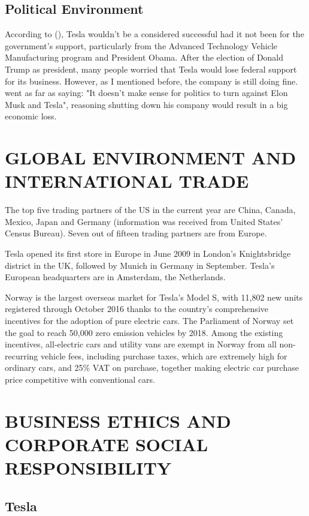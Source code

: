 \documentclass[12pt]{article}
\begin{document}
\subsection{Political Environment}

According to (\cite{ko13}), Tesla wouldn't be a considered successful had it not been for the government's support, particularly from the Advanced Technology Vehicle Manufacturing program and President Obama. After the election of Donald Trump as president, many people worried that Tesla would lose federal support for its business. However, as I mentioned before, the company is still doing fine. \textcite{de16} went as far as saying: "It doesn't make sense for politics to turn against Elon Musk and Tesla", reasoning shutting down his company would result in a big economic loss.

\section{GLOBAL ENVIRONMENT AND INTERNATIONAL TRADE}

The top five trading partners of the US in the current year are China, Canada, Mexico, Japan and Germany (information was received from United States' Census Bureau). Seven out of fifteen trading partners are from Europe.

Tesla opened its first store in Europe in June 2009 in London's Knightsbridge district in the UK, followed by Munich in Germany in September. Tesla's European headquarters are in Amsterdam, the Netherlands.

Norway is the largest overseas market for Tesla's Model S, with 11,802 new units registered through October 2016 thanks to the country's comprehensive incentives for the adoption of pure electric cars. The Parliament of Norway set the goal to reach 50,000 zero emission vehicles by 2018. Among the existing incentives, all-electric cars and utility vans are exempt in Norway from all non-recurring vehicle fees, including purchase taxes, which are extremely high for ordinary cars, and 25\% VAT on purchase, together making electric car purchase price competitive with conventional cars.

\section{BUSINESS ETHICS AND CORPORATE SOCIAL RESPONSIBILITY}

\subsection{Tesla}
\end{document}
